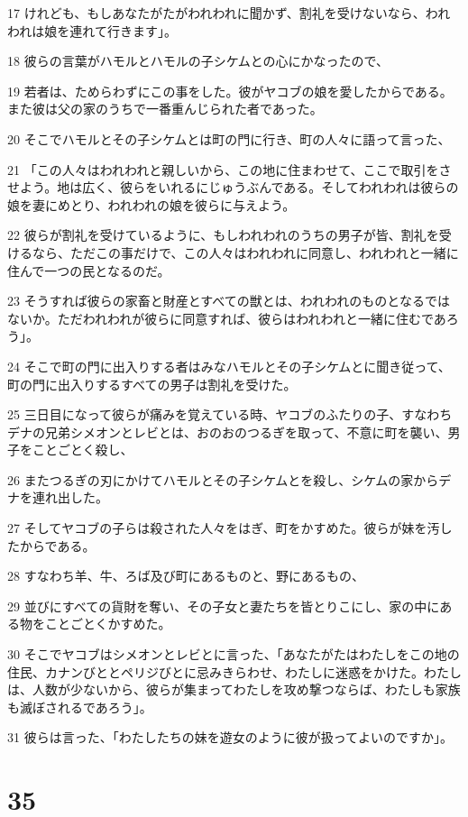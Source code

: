 \par 17 けれども、もしあなたがたがわれわれに聞かず、割礼を受けないなら、われわれは娘を連れて行きます」。
\par 18 彼らの言葉がハモルとハモルの子シケムとの心にかなったので、
\par 19 若者は、ためらわずにこの事をした。彼がヤコブの娘を愛したからである。また彼は父の家のうちで一番重んじられた者であった。
\par 20 そこでハモルとその子シケムとは町の門に行き、町の人々に語って言った、
\par 21 「この人々はわれわれと親しいから、この地に住まわせて、ここで取引をさせよう。地は広く、彼らをいれるにじゅうぶんである。そしてわれわれは彼らの娘を妻にめとり、われわれの娘を彼らに与えよう。
\par 22 彼らが割礼を受けているように、もしわれわれのうちの男子が皆、割礼を受けるなら、ただこの事だけで、この人々はわれわれに同意し、われわれと一緒に住んで一つの民となるのだ。
\par 23 そうすれば彼らの家畜と財産とすべての獣とは、われわれのものとなるではないか。ただわれわれが彼らに同意すれば、彼らはわれわれと一緒に住むであろう」。
\par 24 そこで町の門に出入りする者はみなハモルとその子シケムとに聞き従って、町の門に出入りするすべての男子は割礼を受けた。
\par 25 三日目になって彼らが痛みを覚えている時、ヤコブのふたりの子、すなわちデナの兄弟シメオンとレビとは、おのおのつるぎを取って、不意に町を襲い、男子をことごとく殺し、
\par 26 またつるぎの刃にかけてハモルとその子シケムとを殺し、シケムの家からデナを連れ出した。
\par 27 そしてヤコブの子らは殺された人々をはぎ、町をかすめた。彼らが妹を汚したからである。
\par 28 すなわち羊、牛、ろば及び町にあるものと、野にあるもの、
\par 29 並びにすべての貨財を奪い、その子女と妻たちを皆とりこにし、家の中にある物をことごとくかすめた。
\par 30 そこでヤコブはシメオンとレビとに言った、「あなたがたはわたしをこの地の住民、カナンびととペリジびとに忌みきらわせ、わたしに迷惑をかけた。わたしは、人数が少ないから、彼らが集まってわたしを攻め撃つならば、わたしも家族も滅ぼされるであろう」。
\par 31 彼らは言った、「わたしたちの妹を遊女のように彼が扱ってよいのですか」。

\chapter{35}

